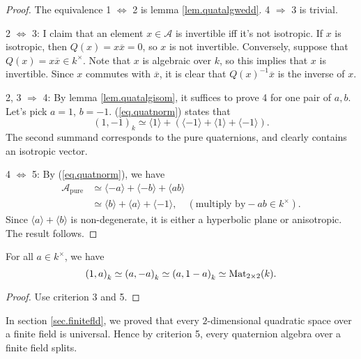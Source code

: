 \documentclass{article}
\newcommand{\qa}[2]{\left(#1\right)_{#2}}
\begin{document}
\begin{proof}
    The equivalence 1 $\Longleftrightarrow$ 2 is lemma \ref{lem.quatalgwedd}. 4 $\Longrightarrow$ 3 is trivial. 
    
    2 $\Longleftrightarrow$ 3: I claim that an element $x\in\mathcal{A}$ is invertible iff it's not isotropic. If $x$ is isotropic, then $Q(x)=x\overline{x}=0$, so $x$ is not invertible. Conversely, suppose that $Q(x)=x\overline{x}\in k^\times$. Note that $x$ is algebraic over $k$, so this implies that $x$ is invertible. Since $x$ commutes with $\overline{x}$, it is clear that $Q(x)^{-1}\overline{x}$ is the inverse of $x$.
    
    2, 3 $\Longrightarrow$ 4: By lemma \ref{lem.quatalgisom}, it suffices to prove 4 for one pair of $a,b$. Let's pick $a=1$, $b=-1$. (\ref{eq.quatnorm}) states that
    \begin{equation*}
        \qa{1,-1}{k}\simeq \langle 1\rangle+\left(\langle -1\rangle+\langle 1\rangle+\langle -1\rangle\right).
    \end{equation*}
    The second summand corresponds to the pure quaternions, and clearly contains an isotropic vector.

    4 $\Longleftrightarrow$ 5: By (\ref{eq.quatnorm}), we have
    \begin{align*}
        \mathcal{A}_{\text{pure}} &\simeq \langle -a\rangle+\langle -b\rangle+\langle ab\rangle \\
        &\simeq \langle b\rangle+\langle a\rangle+\langle -1\rangle,
        \quad \left(\text{multiply by} -ab\in k^\times\right).
    \end{align*}
    Since $\langle a\rangle+\langle b\rangle$ is non-degenerate, it is either a hyperbolic plane or anisotropic. The result follows.
\end{proof}

\begin{corollary}
    For all $a\in k^\times$, we have
    \begin{equation*}
        \qa{1,a}{k} \simeq \qa{a,-a}{k}\simeq \qa{a,1-a}{k}\simeq \Mat{2\times 2}(k).
    \end{equation*}
\end{corollary}

\begin{proof}
    Use criterion 3 and 5.
\end{proof}

\begin{example}
    In section \ref{sec.finitefld}, we proved that every $2$-dimensional quadratic space over a finite field is universal. Hence by criterion 5, every quaternion algebra over a finite field splits.
\end{example}
\end{document}
